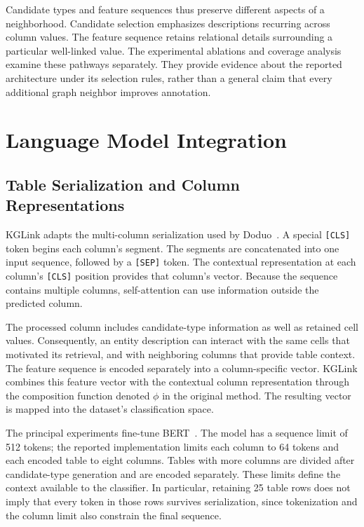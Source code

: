 Candidate types and feature sequences thus preserve different aspects of a neighborhood. Candidate selection emphasizes descriptions recurring across column values. The feature sequence retains relational details surrounding a particular well-linked value. The experimental ablations and coverage analysis examine these pathways separately. They provide evidence about the reported architecture under its selection rules, rather than a general claim that every additional graph neighbor improves annotation.

\section{Language Model Integration}
\label{sec:kglink:language-model}

\subsection{Table Serialization and Column Representations}
\label{sec:kglink:serialization}

KGLink adapts the multi-column serialization used by Doduo~\cite{kglink-suhara2022annotating}. A special \texttt{[CLS]} token begins each column's segment. The segments are concatenated into one input sequence, followed by a \texttt{[SEP]} token. The contextual representation at each column's \texttt{[CLS]} position provides that column's vector. Because the sequence contains multiple columns, self-attention can use information outside the predicted column.

The processed column includes candidate-type information as well as retained cell values. Consequently, an entity description can interact with the same cells that motivated its retrieval, and with neighboring columns that provide table context. The feature sequence is encoded separately into a column-specific vector. KGLink combines this feature vector with the contextual column representation through the composition function denoted $\phi$ in the original method. The resulting vector is mapped into the dataset's classification space.

The principal experiments fine-tune BERT~\cite{kglink-devlin2018bert}. The model has a sequence limit of 512 tokens; the reported implementation limits each column to 64 tokens and each encoded table to eight columns. Tables with more columns are divided after candidate-type generation and are encoded separately. These limits define the context available to the classifier. In particular, retaining 25 table rows does not imply that every token in those rows survives serialization, since tokenization and the column limit also constrain the final sequence.

